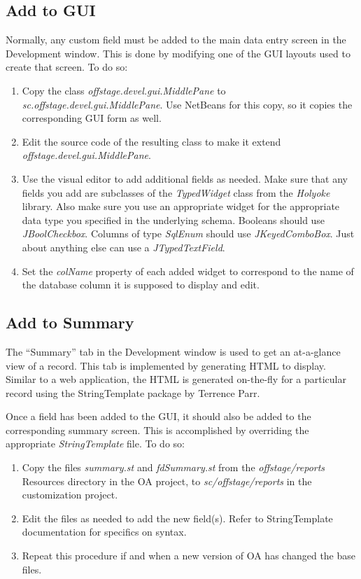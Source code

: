 \documentclass[11pt]{article}
\begin{document}
\subsection{Add to GUI}

Normally, any custom field must be added to the main data entry screen in the Development window.  This is done by modifying one of the GUI layouts used to create that screen.  To do so:

\begin{enumerate}
\item Copy the class \emph{offstage.devel.gui.MiddlePane} to \emph{sc.offstage.devel.gui.MiddlePane}.  Use NetBeans for this copy, so it copies the corresponding GUI form as well.
 \item Edit the source code of the resulting class to make it extend \emph{offstage.devel.gui.MiddlePane}.
 \item Use the visual editor to add additional fields as needed.  Make sure that any fields you add are subclasses of the \emph{TypedWidget} class from the \emph{Holyoke} library.  Also make sure you use an appropriate widget for the appropriate data type you specified in the underlying schema.  Booleans should use \emph{JBoolCheckbox}.  Columns of type \emph{SqlEnum} should use \emph{JKeyedComboBox}.  Just about anything else can use a \emph{JTypedTextField}.
 \item Set the \emph{colName} property of each added widget to correspond to the name of the database column it is supposed to display and edit.
 \end{enumerate}

\subsection{Add to Summary}

The ``Summary'' tab in the Development window is used to get an at-a-glance view of a record.  This tab is implemented by generating HTML to display.  Similar to a web application, the HTML is generated on-the-fly for a particular record using the StringTemplate package by Terrence Parr.

Once a field has been added to the GUI, it should also be added to the corresponding summary screen.  This is accomplished by overriding the appropriate \emph{StringTemplate} file.  To do so:

\begin{enumerate}
\item Copy the files \emph{summary.st} and \emph{fdSummary.st} from the \emph{offstage/reports} Resources directory in the OA project, to \emph{sc/offstage/reports} in the customization project.
 \item Edit the files as needed to add the new field(s).  Refer to StringTemplate documentation for specifics on syntax.
 \item Repeat this procedure if and when a new version of OA has changed the base files.
 \end{enumerate}
\end{document}
